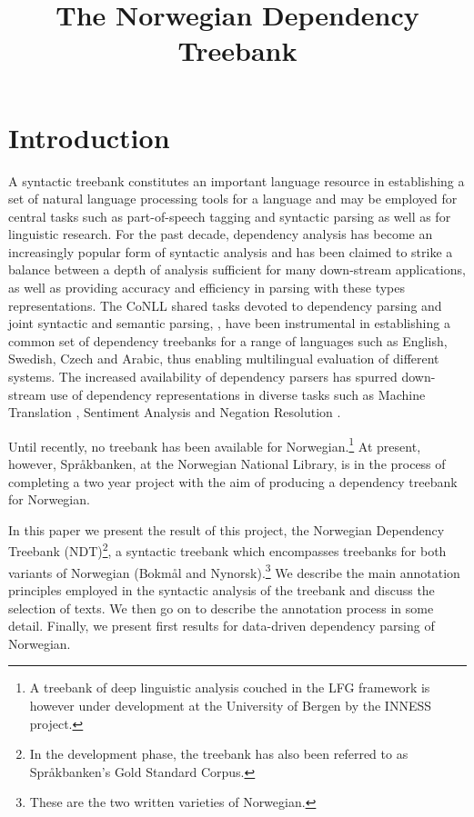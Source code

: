 \documentclass[10pt,a4paper]{article}
\title{The Norwegian Dependency Treebank}
\date{}
\begin{document}
\maketitleabstract

\section{Introduction}
A syntactic treebank constitutes an important language resource in
establishing a set of natural language processing tools for a
language and may be employed for central tasks such as part-of-speech
tagging and syntactic parsing as well as for linguistic research. For the past decade, dependency
analysis has become an increasingly popular form of syntactic analysis
and has been claimed to strike a balance between a depth of analysis
sufficient for many down-stream applications, as well as providing accuracy and
efficiency in parsing with these types representations. The CoNLL
shared tasks devoted to dependency parsing and joint syntactic and
semantic parsing,
\cite{Niv:Hal:Kub:07,Haj:Cia:Joh:09}, have been instrumental in
establishing a common set of dependency treebanks for a range of
languages such as English, Swedish, Czech and Arabic, %
thus enabling multilingual evaluation of different systems.  The increased
availability of dependency parsers has spurred down-stream use of
dependency representations in diverse tasks such as Machine Translation \cite{Din:Pal:05}, Sentiment Analysis \cite{Wil:Wie:Hof:09} and Negation Resolution \cite{Lap:Vel:Ovr:12}.

Until recently, no treebank has been available for
Norwegian.\footnote{A treebank of deep linguistic analysis couched in
  the LFG framework is however under development at the University of Bergen
  by the INNESS project.}
At present, however, Spr{\aa}kbanken, at the Norwegian National Library,
is in the process of completing a two year project with the aim of
producing a dependency treebank for Norwegian.

In this paper we present the result of this project, the Norwegian
Dependency Treebank (NDT)\footnote{In the development phase, the treebank has also been referred to as Språkbanken's Gold Standard Corpus.}, a syntactic treebank which encompasses
treebanks for both variants of Norwegian (Bokm{\aa}l and
Nynorsk).\footnote{These are the two written varieties of Norwegian.}
We describe the main annotation principles employed
in the syntactic analysis of the treebank and discuss the selection of
texts. We then go on to describe the annotation process in some
detail. Finally, we present first results for data-driven dependency
parsing of Norwegian.
\end{document}
